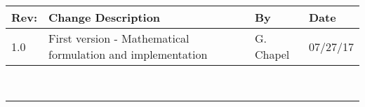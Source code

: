 \documentclass[]{BasiliskReportMemo}
\begin{document}
	
	\makeCover
	
\pagestyle{empty}
{\renewcommand{\arraystretch}{2}
	\noindent
	\begin{longtable}{|p{0.3in}|p{4.01in}|p{.94in}|p{0.7in}|}
		\hline
		{\bfseries Rev}: & {\bfseries Change Description} & {\bfseries By} & {\bfseries Date} \\
		\hline
		1.0 & First version - Mathematical formulation and implementation & G. Chapel & 07/27/17\\
		\hline
		
	\end{longtable}
}
	
	
	
	\newpage
	\setcounter{page}{1}
	\pagestyle{fancy}
	
	\tableofcontents %
	~\\ \hrule ~\\ %
	
	
	
	
	
	
	
	
	
	
	
	
	
	
	
\end{document}

